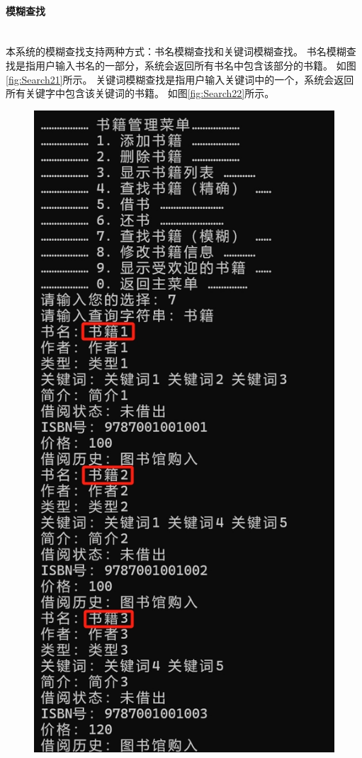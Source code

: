 \documentclass[12pt,twoside]{ctexart}
\begin{document}
\paragraph{模糊查找}\mbox{}\\

本系统的模糊查找支持两种方式：书名模糊查找和关键词模糊查找。
书名模糊查找是指用户输入书名的一部分，系统会返回所有书名中包含该部分的书籍。
如图\ref{fig:Search21}所示。
关键词模糊查找是指用户输入关键词中的一个，系统会返回所有关键字中包含该关键词的书籍。
如图\ref{fig:Search22}所示。

\begin{figure}[H]
    \centering
    \begin{minipage}{0.48\textwidth}
        \centering
        \includegraphics[width=\linewidth]{Book/Search2.png}

\end{minipage}
\end{figure}
\end{document}
